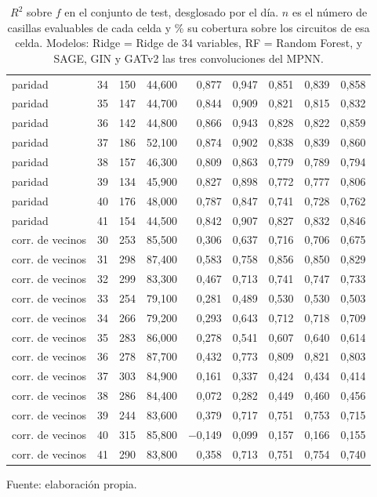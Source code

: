\begin{table}[htbp]
{\begin{tabular}{@{}lrrrrrrrr@{}}
        paridad & 34 & 150 & 44,600 & 0,877 & 0,947 & 0,851 & 0,839 & 0,858 \\
        paridad & 35 & 147 & 44,700 & 0,844 & 0,909 & 0,821 & 0,815 & 0,832 \\
        paridad & 36 & 142 & 44,800 & 0,866 & 0,943 & 0,828 & 0,822 & 0,859 \\
        paridad & 37 & 186 & 52,100 & 0,874 & 0,902 & 0,838 & 0,839 & 0,860 \\
        paridad & 38 & 157 & 46,300 & 0,809 & 0,863 & 0,779 & 0,789 & 0,794 \\
        paridad & 39 & 134 & 45,900 & 0,827 & 0,898 & 0,772 & 0,777 & 0,806 \\
        paridad & 40 & 176 & 48,000 & 0,787 & 0,847 & 0,741 & 0,728 & 0,762 \\
        paridad & 41 & 154 & 44,500 & 0,842 & 0,907 & 0,827 & 0,832 & 0,846 \\
        corr. de vecinos & 30 & 253 & 85,500 & 0,306 & 0,637 & 0,716 & 0,706 & 0,675 \\
        corr. de vecinos & 31 & 298 & 87,400 & 0,583 & 0,758 & 0,856 & 0,850 & 0,829 \\
        corr. de vecinos & 32 & 299 & 83,300 & 0,467 & 0,713 & 0,741 & 0,747 & 0,733 \\
        corr. de vecinos & 33 & 254 & 79,100 & 0,281 & 0,489 & 0,530 & 0,530 & 0,503 \\
        corr. de vecinos & 34 & 266 & 79,200 & 0,293 & 0,643 & 0,712 & 0,718 & 0,709 \\
        corr. de vecinos & 35 & 283 & 86,000 & 0,278 & 0,541 & 0,607 & 0,640 & 0,614 \\
        corr. de vecinos & 36 & 278 & 87,700 & 0,432 & 0,773 & 0,809 & 0,821 & 0,803 \\
        corr. de vecinos & 37 & 303 & 84,900 & 0,161 & 0,337 & 0,424 & 0,434 & 0,414 \\
        corr. de vecinos & 38 & 286 & 84,400 & 0,072 & 0,282 & 0,449 & 0,460 & 0,456 \\
        corr. de vecinos & 39 & 244 & 83,600 & 0,379 & 0,717 & 0,751 & 0,753 & 0,715 \\
        corr. de vecinos & 40 & 315 & 85,800 & $-$0,149 & 0,099 & 0,157 & 0,166 & 0,155 \\
        corr. de vecinos & 41 & 290 & 83,800 & 0,358 & 0,713 & 0,751 & 0,754 & 0,740 \\
        \bottomrule
    \end{tabular}}

    \caption{$R^2$ sobre $f$ en el conjunto de test, desglosado por el día. $n$ es el número de casillas evaluables de cada celda y \% su cobertura sobre los circuitos de esa celda. Modelos: Ridge = Ridge de 34 variables, RF = Random Forest, y SAGE, GIN y GATv2 las tres convoluciones del MPNN.}
    \label{tab:v2_tiempo_r2_f}

    {\footnotesize Fuente: elaboración propia.}
\end{table}
